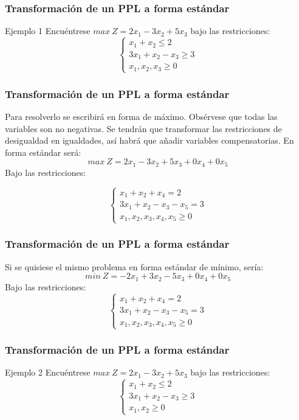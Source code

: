 \documentclass{beamer}
\begin{document}
\begin{frame}
\frametitle{Transformaci\'on de un PPL a forma est\'andar}
\begin{block}{Ejemplo 1}
Encu\'entrese $max\ Z = 2x_1-3x_2+5x_3$ bajo las restricciones:
\[\left\{\begin{array}{l}x_1+x_2 \leq 2 \\3x_1+x_2-x_3\geq 3 \\x_1,x_2,x_3\geq 0 \end{array}\right.\]

\end{block}
\end{frame}



\begin{frame}
\frametitle{Transformaci\'on de un PPL a forma est\'andar}
Para resolverlo se escribir\'a en forma de m\'aximo. Obs\'ervese que todas las variables son no negativas. Se tendr\'an que transformar las restricciones de desigualdad en igualdades, as\'i habr\'a que a\~nadir variables compensatorias. En forma est\'andar ser\'a:
\[max\ Z = 2x_1-3x_2+5x_3+0x_4+0x_5\]
Bajo las restricciones:

\[\left\{\begin{array}{l}x_1+x_2 +x_4  = 2 \\3x_1+x_2-x_3-x_5 = 3 \\x_1,x_2,x_3, x_4, x_5\geq 0 \end{array}\right.\]

\end{frame}



\begin{frame}
\frametitle{Transformaci\'on de un PPL a forma est\'andar}
Si se quisiese el mismo problema en forma est\'andar de m\'inimo, ser\'ia:
\[min\ Z = -2x_1+3x_2-5x_3+0x_4+0x_5\]
Bajo las restricciones:
\[\left\{\begin{array}{l}x_1+x_2 +x_4  = 2 \\3x_1+x_2-x_3-x_5 = 3 \\x_1,x_2,x_3, x_4, x_5\geq 0 \end{array}\right.\]

\end{frame}



\begin{frame}
\frametitle{Transformaci\'on de un PPL a forma est\'andar}
\begin{block}{Ejemplo 2}
Encu\'entrese $max\ Z = 2x_1-3x_2+5x_3$ bajo las restricciones:
\[\left\{\begin{array}{l}x_1+x_2 \leq 2 \\3x_1+x_2-x_3\geq 3 \\x_1,x_2\geq 0 \end{array}\right.\]

\end{block}
\end{frame}
\end{document}

